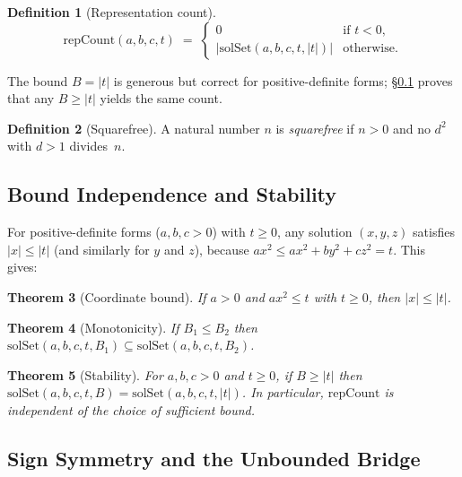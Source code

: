 \documentclass[11pt,a4paper]{article}
\newtheorem{theorem}{Theorem}[section]
\theoremstyle{definition}
\newtheorem{definition}[theorem]{Definition}
\newcommand{\solSet}{\mathrm{solSet}}
\newcommand{\repCount}{\mathrm{repCount}}
\begin{document}
\begin{definition}[Representation count]\label{def:repcount}
\[
  \repCount(a,b,c,t) \;=\;
  \begin{cases}
    0 & \text{if } t < 0,\\
    \bigl|\solSet(a,b,c,t,|t|)\bigr| & \text{otherwise.}
  \end{cases}
\]
\end{definition}

The bound $B = |t|$ is generous but correct for positive-definite
forms; \S\ref{sec:s2} proves that any $B \ge |t|$ yields the same
count.

\begin{definition}[Squarefree]\label{def:sqfree}
A natural number $n$ is \emph{squarefree} if $n > 0$ and no
$d^2$ with $d > 1$ divides~$n$.
\end{definition}

\subsection{Bound Independence and Stability}\label{sec:s2}

For positive-definite forms ($a, b, c > 0$) with $t \ge 0$, any
solution $(x,y,z)$ satisfies $|x| \le |t|$ (and similarly for $y$
and $z$), because $ax^2 \le ax^2 + by^2 + cz^2 = t$.  This gives:

\begin{theorem}[Coordinate bound]\label{thm:coord-bound}
If $a > 0$ and $ax^2 \le t$ with $t \ge 0$, then $|x| \le |t|$.
\end{theorem}

\begin{theorem}[Monotonicity]\label{thm:mono}
If $B_1 \le B_2$ then
$\solSet(a,b,c,t,B_1) \subseteq \solSet(a,b,c,t,B_2)$.
\end{theorem}

\begin{theorem}[Stability]\label{thm:stable}
For $a, b, c > 0$ and $t \ge 0$, if $B \ge |t|$ then
$\solSet(a,b,c,t,B) = \solSet(a,b,c,t,|t|)$.  In particular,
$\repCount$ is independent of the choice of sufficient bound.
\end{theorem}

\subsection{Sign Symmetry and the Unbounded Bridge}\label{sec:s3}
\end{document}

